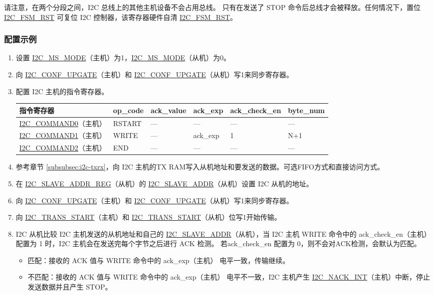 \documentclass[main\_\_CN.tex]{subfiles}
\begin{document}
请注意，在两个分段之间，I2C 总线上的其他主机设备不会占用总线。 只有在发送了 STOP 命令后总线才会被释放。任何情况下，置位 \hyperref[fielddesc:I2CFSMRST]{I2C\_FSM\_RST} 可复位 I2C 控制器，该寄存器硬件自清 \hyperref[fielddesc:I2CFSMRST]{I2C\_FSM\_RST}。

\subsubsection{配置示例}
\begin{enumerate}
\item 设置 \hyperref[fielddesc:I2CMSMODE]{I2C\_MS\_MODE}（主机）为1，\hyperref[fielddesc:I2CMSMODE]{I2C\_MS\_MODE}（从机）为0。
\item 向 \hyperref[fielddesc:I2CCONFUPGATE]{I2C\_CONF\_UPGATE}（主机）和 \hyperref[fielddesc:I2CCONFUPGATE]{I2C\_CONF\_UPGATE}（从机）写1来同步寄存器。
\item 配置 I2C 主机的指令寄存器。
\begin{longtable}{ | p{4cm} | p{2cm} | p{2cm} | p{2cm} |p{2.2cm} | p{1.8cm} |}
\hline\rowcolor{lightgray}
指令寄存器& op\_code & ack\_value&ack\_exp&ack\_check\_en&byte\_num  \\ \hline
\hyperref[fielddesc:I2CCOMMAND0]{I2C\_COMMAND0}（主机）& RSTART& ---&---&---&---  \\ \hline
\hyperref[fielddesc:I2CCOMMAND1]{I2C\_COMMAND1}（主机）& WRITE& ---&ack\_exp&1&N+1  \\ \hline
\hyperref[fielddesc:I2CCOMMAND2]{I2C\_COMMAND2}（主机）& END& ---&---&---&---  \\ \hline
\end{longtable}
\item 参考章节 \ref{subsubsec:i2c-txrx}，向 I2C 主机的TX RAM写入从机地址和要发送的数据。可选FIFO方式和直接访问方式。
\item 在 \hyperref[regdesc:I2CSLAVEADDRREG]{I2C\_SLAVE\_ADDR\_REG}（从机）的 \hyperref[fielddesc:I2CSLAVEADDR]{I2C\_SLAVE\_ADDR}（从机）设置 I2C 从机的地址。
\item 向 \hyperref[fielddesc:I2CCONFUPGATE]{I2C\_CONF\_UPGATE}（主机）和 \hyperref[fielddesc:I2CCONFUPGATE]{I2C\_CONF\_UPGATE}（从机）写1来同步寄存器。
\item 向 \hyperref[fielddesc:I2CTRANSSTART]{I2C\_TRANS\_START}（主机）和 \hyperref[fielddesc:I2CTRANSSTART]{I2C\_TRANS\_START}（从机）位写1开始传输。
\item I2C 从机比较 I2C 主机发送的从机地址和自己的 \hyperref[fielddesc:I2CSLAVEADDR]{I2C\_SLAVE\_ADDR}（从机），当 I2C 主机 WRITE 命令中的 ack\_check\_en（主机） 配置为 1 时，I2C 主机会在发送完每个字节之后进行 ACK 检测。 若ack\_check\_en 配置为 0，则不会对ACK检测，会默认为匹配。
\begin{itemize}
\item 匹配：接收的 ACK 值与 WRITE 命令中的 ack\_exp（主机） 电平一致，传输继续。
\item 不匹配：接收的 ACK 值与 WRITE 命令中的 ack\_exp（主机） 电平不一致，I2C 主机产生 \hyperref[int:i2c-nack]{I2C\_NACK\_INT}（主机）中断，停止发送数据并且产生 STOP。
\end{itemize}


\end{enumerate}
\end{document}
